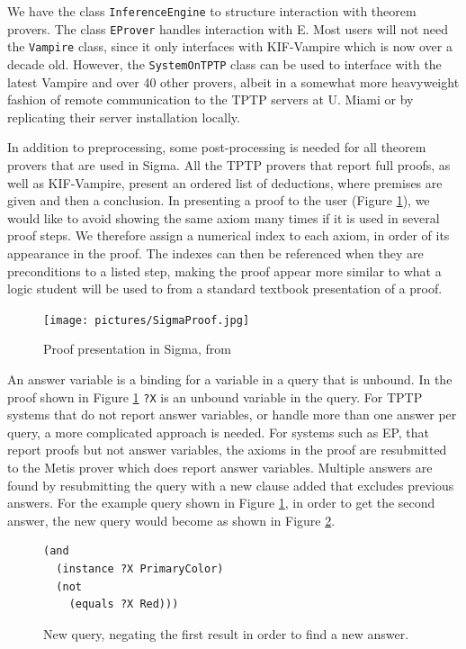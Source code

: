 \documentclass{book}
\begin{document}
We have the class \texttt{InferenceEngine} to
structure interaction with theorem provers.  The class
\texttt{EProver} handles interaction with E.  Most users
will not need the \texttt{Vampire} class, since it only
interfaces with KIF-Vampire which is now over a decade old.  However, the
\texttt{SystemOnTPTP} class can be used to
interface with the latest Vampire and over 40 other provers, albeit in a
somewhat more heavyweight fashion of remote communication to the TPTP servers at
U. Miami or by replicating their server installation locally.

In addition to preprocessing, some post-processing is needed for all theorem
provers that are used in Sigma.  All the TPTP provers that report full proofs,
as well as KIF-Vampire, present an ordered list of deductions, where premises
are given and then a conclusion.  In presenting a proof to the user (Figure
\ref{fig:SigmaProof}), we would like to avoid showing the same axiom many times
if it is used in several proof steps.  We therefore assign a numerical index to
each axiom, in order of its appearance in the proof.  The indexes can then be
referenced when they are preconditions to a listed step, making the proof appear
more similar to what a logic student will be used to from a standard textbook
presentation of a proof.

\begin{figure}
  \centering
  \texttt{[image: pictures/SigmaProof.jpg]}
  \caption{Proof presentation in Sigma, from \cite{tsp08}}
  \label{fig:SigmaProof}
\end{figure}

An answer variable is a binding for a variable in a query that is unbound. In
the proof shown in Figure \ref{fig:SigmaProof} {\tt ?X} is an unbound variable
in the query. For TPTP systems that do not report answer variables, or handle
more than one answer per query, a more complicated approach is needed.  For
systems such as EP, that report proofs but not answer variables, the axioms in
the proof are resubmitted to the Metis prover
\cite{hurd2003firstorder} which does report answer variables.  Multiple answers
are found by resubmitting the query with a new clause added that excludes
previous answers.  For the example query shown in Figure \ref{fig:SigmaProof},
in order to get the second answer, the new query would become as shown in Figure
\ref{fig:NegQuery}.

\begin{figure}
\begin{framed}
\begin{verbatim}
(and
  (instance ?X PrimaryColor)
  (not
    (equals ?X Red)))
\end{verbatim}
\caption{New query, negating the first result in order to find a new answer.}
\label{fig:NegQuery}
\end{framed}
\end{figure}
\end{document}
